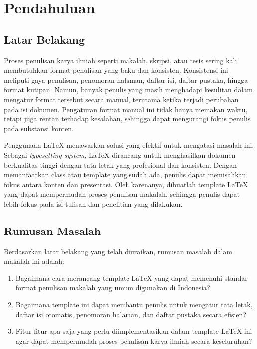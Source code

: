 \chapter{Pendahuluan}


\section{Latar Belakang}

Proses penulisan karya ilmiah seperti makalah, skripsi, atau tesis sering kali membutuhkan format penulisan yang baku dan konsisten. Konsistensi ini meliputi gaya penulisan, penomoran halaman, daftar isi, daftar pustaka, hingga format kutipan. Namun, banyak penulis yang masih menghadapi kesulitan dalam mengatur format tersebut secara manual, terutama ketika terjadi perubahan pada isi dokumen. Pengaturan format manual ini tidak hanya memakan waktu, tetapi juga rentan terhadap kesalahan, sehingga dapat mengurangi fokus penulis pada substansi konten.

Penggunaan LaTeX menawarkan solusi yang efektif untuk mengatasi masalah ini. Sebagai \textit{typesetting system}, LaTeX dirancang untuk menghasilkan dokumen berkualitas tinggi dengan tata letak yang profesional dan konsisten. Dengan memanfaatkan class atau template yang sudah ada, penulis dapat memisahkan fokus antara konten dan presentasi. Oleh karenanya, dibuatlah template LaTeX yang dapat mempermudah proses penulisan makalah, sehingga penulis dapat lebih fokus pada isi tulisan dan penelitian yang dilakukan.

\section{Rumusan Masalah}

Berdasarkan latar belakang yang telah diuraikan, rumusan masalah dalam makalah ini adalah:

\begin{enumerate}
    \item Bagaimana cara merancang template LaTeX yang dapat memenuhi standar format penulisan makalah yang umum digunakan di Indonesia?
    \item Bagaimana template ini dapat membantu penulis untuk mengatur tata letak, daftar isi otomatis, penomoran halaman, dan daftar pustaka secara efisien?
    \item Fitur-fitur apa saja yang perlu diimplementasikan dalam template LaTeX ini agar dapat mempermudah proses penulisan karya ilmiah secara keseluruhan?
\end{enumerate}

